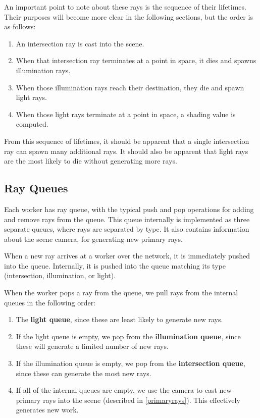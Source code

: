 \documentclass[12pt]{ucthesis}
\begin{document}
An important point to note about these rays is the sequence of their lifetimes.
Their purposes will become more clear in the following sections, but the order
is as follows:

\begin{enumerate}
   \item An intersection ray is cast into the scene.
   \item When that intersection ray terminates at a point in space, it dies and
      spawns illumination rays.
   \item When those illumination rays reach their destination, they die and
      spawn light rays.
   \item When those light rays terminate at a point in space, a shading value
      is computed.
\end{enumerate}

From this sequence of lifetimes, it should be apparent that a single intersection
ray can spawn many additional rays. It should also be apparent that light rays
are the most likely to die without generating more rays.

\subsection {Ray Queues}
\label{queues}

Each worker has ray queue, with the typical push and pop operations for adding
and remove rays from the queue. This queue internally is implemented as three
separate queues, where rays are separated by type. It also contains information
about the scene camera, for generating new primary rays.

When a new ray arrives at a worker over the network, it is immediately pushed
into the queue. Internally, it is pushed into the queue matching its type
(intersection, illumination, or light).

When the worker pops a ray from the queue, we pull rays from the internal
queues in the following order:

\begin{enumerate}
   \item The \textbf{light queue}, since these are least likely to generate
      new rays.
   \item If the light queue is empty, we pop from the \textbf{illumination queue},
      since these will generate a limited number of new rays.
   \item If the illumination queue is empty, we pop from the
      \textbf{intersection queue}, since these can generate the most new rays.
   \item If all of the internal queues are empty, we use the camera to cast
      new primary rays into the scene (described in \ref{primaryrays}). This
      effectively generates new work.
\end{enumerate}
\end{document}
